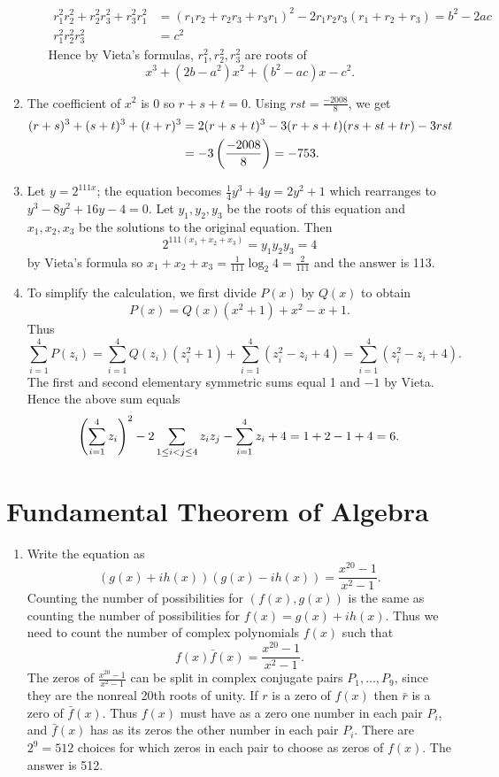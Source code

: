 \begin{enumerate}
\begin{enumerate}
\begin{align*}
r_1^2r_2^2+r_2^2r_3^2+r_3^2r_1^2&=(r_1r_2+r_2r_3+r_3r_1)^2 -2r_1r_2r_3 (r_1+r_2+r_3)=b^2-2ac\\
r_1^2r_2^2r_3^2&=c^2
\end{align*}
Hence by Vieta's formulas, $r_1^2,r_2^2,r_3^2$ are roots of
\[
x^3+(2b-a^2)x^2+(b^2-ac)x-c^2.
\]
\end{enumerate}
\item The coefficient of $x^2$ is 0 so $r+s+t=0$. Using $rst=\frac{-2008}{8}$, we get
\begin{align*}(r+s)^3+(s+t)^3+(t+r)^3&=2(r+s+t)^3-3(r+s+t)(rs+st+tr) -3rst\\
&=-3\left( {\frac{-2008}{8}} \right)=-753.\end{align*}
\item Let $y=2^{111x}$; the equation becomes $\frac{1}{4}y^3+4y=2y^2+1$ which rearranges to $y^3-8y^2+16y-4=0$. Let $y_1,y_2,y_3$ be the roots of this equation and $x_1,x_2,x_3$ be the solutions to the original equation. Then
\[2^{111(x_1+x_2+x_3)}=y_1y_2y_3=4\]
by Vieta's formula so $x_1+x_2+x_3=\frac1{111}\log_2 4=\frac 2{111}$ and the answer is 113.
\item To simplify the calculation, we first divide $P(x)$ by $Q(x)$ to obtain
\[P(x)=Q(x)(x^2+1)+x^2-x+1.\]
Thus
\[\sum_{i=1}^4 P(z_i)=\sum_{i=1}^4 Q(z_i)(z_i^2+1)+\sum_{i=1}^4 (z_i^2-z_i+4)=\sum_{i=1}^4 (z_i^2-z_i+4).\]
The first and second elementary symmetric sums equal 1 and $-1$ by Vieta. Hence the above sum equals
\[
\left( {\sum_{i=1}^4 z_i} \right)^2-2\sum_{1\leq i<j\leq 4} z_iz_j-\sum_{i=1}^4 z_i+4=1+2-1+4=6.
\]
\end{enumerate}
\section{Fundamental Theorem of Algebra}
\begin{enumerate}
\item Write the equation as 
\[
(g(x)+ih(x))(g(x)-ih(x))=\frac{x^{20}-1}{x^2-1}.
\]
Counting the number of possibilities for $(f(x),g(x))$ is the same as counting the number of possibilities for $f(x)=g(x)+ih(x)$. 
Thus we need to count the number of complex polynomials $f(x)$ such that 
\[
f(x)\bar{f}(x)=\frac{x^{20}-1}{x^2-1}.
\]
The zeros of $\frac{x^{20}-1}{x^2-1}$ can be split in complex conjugate pairs $P_1,\ldots, P_9$, since they are the nonreal 20th roots of unity. If $r$ is a zero of $f(x)$ then $\bar r$ is a zero of $\bar{f}(x)$. Thus $f(x)$ must have as a zero one number in each pair $P_i$, and $\bar{f}(x)$ has as its zeros the other number in each pair $P_i$. There are $2^9=512$ choices for which zeros in each pair to choose as zeros of $f(x)$. The answer is 512.
\end{enumerate}
